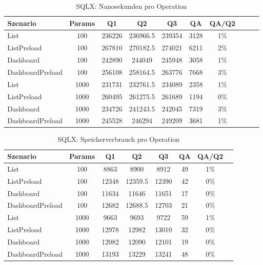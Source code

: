 
\begin{table}[ht]
\centering
\caption{SQLX: Nanosekunden pro Operation}
\begin{tabular}{lccccccccc}
\toprule
Szenario & Params & Q1 & Q2 & Q3 & QA & QA/Q2 \\
\midrule
	List & 100 & 236226 & 236966.5 & 239354 & 3128 & 1\% \\
	ListPreload & 100 & 267810 & 270182.5 & 274021 & 6211 & 2\% \\
	Dashboard & 100 & 242890 & 244049 & 245948 & 3058 & 1\% \\
	DashboardPreload & 100 & 256108 & 258164.5 & 263776 & 7668 & 3\% \\
	List & 1000 & 231731 & 232761.5 & 234089 & 2358 & 1\% \\
	ListPreload & 1000 & 260495 & 261275.5 & 261689 & 1194 & 0\% \\
	Dashboard & 1000 & 234726 & 241243.5 & 242045 & 7319 & 3\% \\
	DashboardPreload & 1000 & 245528 & 246294 & 249209 & 3681 & 1\% \\
\bottomrule
\end{tabular}
\label{tab:benchmark_sqlx_nsperop}
\end{table}
	
\begin{table}[ht]
\centering
\caption{SQLX: Speicherverbrauch pro Operation}
\begin{tabular}{lccccccc}
\toprule
Szenario & Params & Q1 & Q2 & Q3 & QA & QA/Q2 \\
\midrule
	List & 100 & 8863 & 8900 & 8912 & 49 & 1\% \\
	ListPreload & 100 & 12348 & 12359.5 & 12390 & 42 & 0\% \\
	Dashboard & 100 & 11634 & 11646 & 11651 & 17 & 0\% \\
	DashboardPreload & 100 & 12682 & 12688.5 & 12703 & 21 & 0\% \\
	List & 1000 & 9663 & 9693 & 9722 & 59 & 1\% \\
	ListPreload & 1000 & 12978 & 12982 & 13010 & 32 & 0\% \\
	Dashboard & 1000 & 12082 & 12090 & 12101 & 19 & 0\% \\
	DashboardPreload & 1000 & 13193 & 13229 & 13241 & 48 & 0\% \\
\bottomrule
\end{tabular}
\label{tab:benchmark_sqlx_bytesperop}
\end{table}
	
